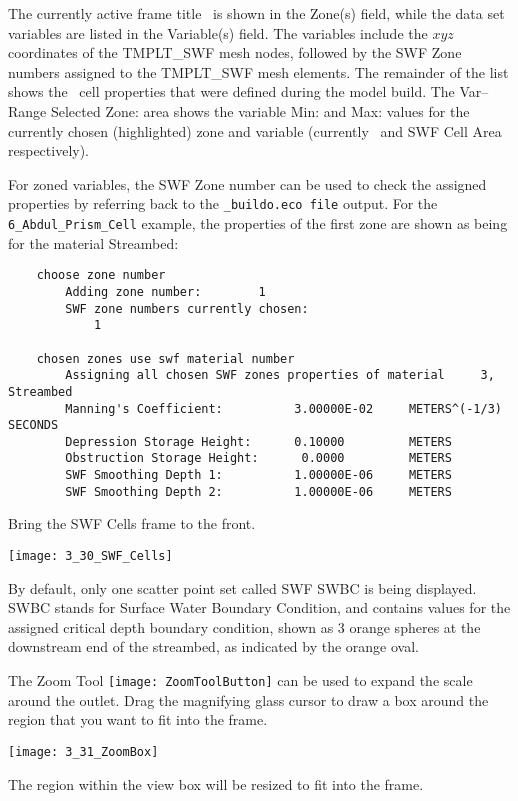 The currently active frame title \swf\ is shown in the {\sf Zone(s)} field, while the data set variables are listed in the {\sf Variable(s)} field. The variables include the $xyz$ coordinates of the {\sf TMPLT\_SWF} mesh nodes, followed by the {\sf SWF Zone} numbers assigned to the {\sf TMPLT\_SWF} mesh elements.  The remainder of the list shows the \mfus\ cell properties that were defined during the model build. The {\sf Var--Range Selected Zone:} area shows the variable {\sf Min:} and {\sf Max:} values for the currently chosen (highlighted) zone and variable (currently \swf\ and {\sf SWF Cell Area} respectively).

For zoned variables, the {\sf SWF Zone} number can be used to check the assigned properties by referring back to the {\tt \_buildo.eco file} output.  For the {\tt 6\_Abdul\_Prism\_Cell} example, the properties of the first zone are shown as being for the material {\sf Streambed}:
\begin{verbatim}
    choose zone number
    	Adding zone number:        1
    	SWF zone numbers currently chosen:
    	    1

    chosen zones use swf material number
    	Assigning all chosen SWF zones properties of material     3, Streambed
    	Manning's Coefficient:          3.00000E-02     METERS^(-1/3)  SECONDS
    	Depression Storage Height:      0.10000         METERS
    	Obstruction Storage Height:      0.0000         METERS
    	SWF Smoothing Depth 1:          1.00000E-06     METERS
    	SWF Smoothing Depth 2:          1.00000E-06     METERS
\end{verbatim}

Bring the {\sf SWF Cells} frame to the front.

        \texttt{[image: 3\_30\_SWF\_Cells]}

By default, only one scatter point set called {\sf SWF SWBC} is being displayed. {\sf SWBC} stands for Surface Water Boundary Condition, and contains values for the assigned critical depth boundary condition, shown as 3 orange spheres at the downstream end  of the streambed, as indicated by the orange oval.

 The Zoom Tool \texttt{[image: ZoomToolButton]} can be used to expand the scale around the outlet.  Drag the magnifying glass cursor to draw a box around the region that you want to fit into the frame.

        \texttt{[image: 3\_31\_ZoomBox]}

The region within the view box will be resized to fit into the frame.

